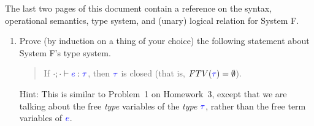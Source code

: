 \documentclass{article}
\theoremstyle{definition}
\newcommand{\meta}[1]{{\color{blue}#1}}
\begin{document}
\noindent{}The last two pages of this document contain a reference on the syntax, operational semantics, type system, and (unary) logical relation for System F.
\begin{enumerate}[start=1,label={{\bf Problem \arabic*}.},ref=\arabic*,left=0pt..0pt,widest*=10,align=left,itemindent=*]
\item Prove (by induction on a thing of your choice) the following statement about System F's type system.
  \begin{quote}
    If $\cdot;\cdot\vdash\meta{e}:\meta{\tau}$, then $\meta{\tau}$ is closed (that is, $FTV(\meta{\tau}) = \emptyset$).
  \end{quote}

  Hint: This is similar to Problem~1 on Homework~3, except that we are talking about the free \emph{type} variables of the \emph{type} $\meta{\tau}$,
  rather than the free term variables of $\meta{e}$.


\end{enumerate}
\end{document}
